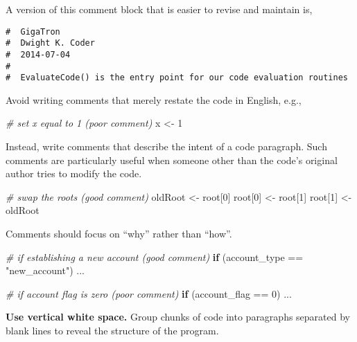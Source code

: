 \documentclass[
]{book}
\newenvironment{Shaded}{\begin{snugshade}}{\end{snugshade}}
\newcommand{\CommentTok}[1]{\textcolor[rgb]{0.56,0.35,0.01}{\textit{#1}}}
\newcommand{\ControlFlowTok}[1]{\textcolor[rgb]{0.13,0.29,0.53}{\textbf{#1}}}
\newcommand{\DecValTok}[1]{\textcolor[rgb]{0.00,0.00,0.81}{#1}}
\newcommand{\NormalTok}[1]{#1}
\newcommand{\OtherTok}[1]{\textcolor[rgb]{0.56,0.35,0.01}{#1}}
\newcommand{\SpecialCharTok}[1]{\textcolor[rgb]{0.00,0.00,0.00}{#1}}
\newcommand{\StringTok}[1]{\textcolor[rgb]{0.31,0.60,0.02}{#1}}
\begin{document}
A version of this comment block that is easier to revise and maintain is,

\begin{verbatim}
#  GigaTron  
#  Dwight K. Coder  
#  2014-07-04  
# 
#  EvaluateCode() is the entry point for our code evaluation routines 
\end{verbatim}

Avoid writing comments that merely restate the code in English, e.g.,

\begin{Shaded}
\begin{Highlighting}[]
\CommentTok{\# set x equal to 1  (poor comment)}
\NormalTok{x }\OtherTok{\textless{}{-}} \DecValTok{1}
\end{Highlighting}
\end{Shaded}

Instead, write comments that describe the intent of a code paragraph. Such comments are particularly useful when someone other than the code's original author tries to modify the code.

\begin{Shaded}
\begin{Highlighting}[]
\CommentTok{\# swap the roots (good comment)}
\NormalTok{oldRoot }\OtherTok{\textless{}{-}}\NormalTok{ root[}\DecValTok{0}\NormalTok{]}
\NormalTok{root[}\DecValTok{0}\NormalTok{] }\OtherTok{\textless{}{-}}\NormalTok{ root[}\DecValTok{1}\NormalTok{]}
\NormalTok{root[}\DecValTok{1}\NormalTok{] }\OtherTok{\textless{}{-}}\NormalTok{ oldRoot}
\end{Highlighting}
\end{Shaded}

Comments should focus on ``why'' rather than ``how''.

\begin{Shaded}
\begin{Highlighting}[]
\CommentTok{\# if establishing a new account (good comment)}
\ControlFlowTok{if}\NormalTok{ (account\_type }\SpecialCharTok{==} \StringTok{"new\_account"}\NormalTok{) ...}

\CommentTok{\# if account flag is zero (poor comment) }
\ControlFlowTok{if}\NormalTok{ (account\_flag }\SpecialCharTok{==} \DecValTok{0}\NormalTok{) ...}
\end{Highlighting}
\end{Shaded}

\textbf{Use vertical white space.} Group chunks of code into paragraphs separated by blank lines to reveal the structure of the program.
\end{document}
